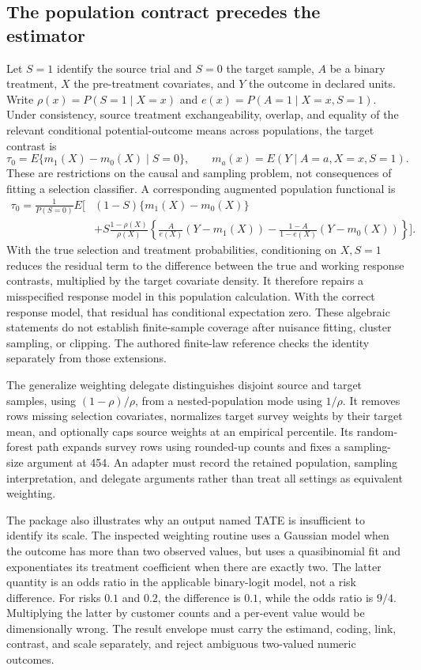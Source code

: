 \subsection{The population contract precedes the estimator}

Let $S=1$ identify the source trial and $S=0$ the target sample, $A$ be a binary treatment, $X$ the pre-treatment covariates, and $Y$ the outcome in declared units. Write $\rho(x)=P(S=1\mid X=x)$ and $e(x)=P(A=1\mid X=x,S=1)$. Under consistency, source treatment exchangeability, overlap, and equality of the relevant conditional potential-outcome means across populations, the target contrast is
\[
 \tau_0=E\{m_1(X)-m_0(X)\mid S=0\},\qquad
 m_a(x)=E(Y\mid A=a,X=x,S=1).
\]
These are restrictions on the causal and sampling problem, not consequences of fitting a selection classifier. A corresponding augmented population functional is
\begin{align*}
 \tau_0=\frac{1}{P(S=0)}E\bigg[&(1-S)\{m_1(X)-m_0(X)\}\\
 &+S\frac{1-\rho(X)}{\rho(X)}
 \left\{\frac{A}{e(X)}(Y-m_1(X))
       -\frac{1-A}{1-e(X)}(Y-m_0(X))\right\}\bigg].
\end{align*}
With the true selection and treatment probabilities, conditioning on $X,S=1$ reduces the residual term to the difference between the true and working response contrasts, multiplied by the target covariate density. It therefore repairs a misspecified response model in this population calculation. With the correct response model, that residual has conditional expectation zero. These algebraic statements do not establish finite-sample coverage after nuisance fitting, cluster sampling, or clipping. The authored finite-law reference checks the identity separately from those extensions.~\citep{exec25_rtm_choice}

The generalize weighting delegate distinguishes disjoint source and target samples, using $(1-\rho)/\rho$, from a nested-population mode using $1/\rho$. It removes rows missing selection covariates, normalizes target survey weights by their target mean, and optionally caps source weights at an empirical percentile. Its random-forest path expands survey rows using rounded-up counts and fixes a sampling-size argument at 454. An adapter must record the retained population, sampling interpretation, and delegate arguments rather than treat all settings as equivalent weighting.~\citep{exec25_rtm_generalize}

The package also illustrates why an output named TATE is insufficient to identify its scale. The inspected weighting routine uses a Gaussian model when the outcome has more than two observed values, but uses a quasibinomial fit and exponentiates its treatment coefficient when there are exactly two. The latter quantity is an odds ratio in the applicable binary-logit model, not a risk difference. For risks $0.1$ and $0.2$, the difference is $0.1$, while the odds ratio is $9/4$. Multiplying the latter by customer counts and a per-event value would be dimensionally wrong. The result envelope must carry the estimand, coding, link, contrast, and scale separately, and reject ambiguous two-valued numeric outcomes.~\citep{exec25_rtm_generalize,exec25_rtm_choice}

